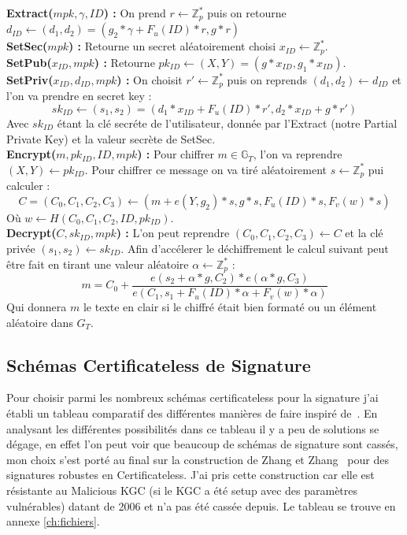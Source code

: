 \textbf{Extract($mpk, \gamma, ID$) :} On prend $r \leftarrow \mathbb{Z}_p^*$ puis on retourne $d_{ID} \leftarrow (d_1, d_2) = (g_2*\gamma + F_u(ID)*r, g*r)$\\
\textbf{SetSec($mpk$) :} Retourne un secret aléatoirement choisi $x_{ID} \leftarrow \mathbb{Z}_p^*$.\\
\textbf{SetPub($x_{ID}, mpk$) :} Retourne $pk_{ID} \leftarrow (X,Y) = (g*x_{ID}, g_1*x_{ID})$.\\
\textbf{SetPriv($x_{ID}, d_{ID}, mpk$) :} On choisit $r' \leftarrow \mathbb{Z}_p^*$ puis on reprends $(d_1, d_2) \leftarrow d_{ID}$ et l'on va prendre en secret key : 
\[sk_{ID} \leftarrow (s_1, s_2) = (d_1*x_{ID} + F_u(ID)*r', d_2*x_{ID} + g*r')\]
Avec $sk_{ID}$ étant la clé secréte de l'utilisateur, donnée par l'Extract (notre Partial Private Key) et la valeur secrète de SetSec.\\
\textbf{Encrypt($m, pk_{ID}, ID, mpk$) :} Pour chiffrer $m \in \mathbb{G}_T$, l'on va reprendre $(X,Y) \leftarrow pk_{ID}$. Pour chiffrer ce message on va tiré aléatoirement $s \leftarrow \mathbb{Z}_p^*$ pui calculer : 
\[C = (C_0, C_1, C_2, C_3) \leftarrow (m + e(Y, g_2)*s, g*s,F_u(ID)*s, F_v(w)*s )\]
Où $w \leftarrow H(C_0,C_1, C_2, ID, pk_{ID})$.\\
\textbf{Decrypt($C, sk_{ID}, mpk$) :} L'on peut reprendre $(C_0,C_1,C_2,C_3) \leftarrow C$ et la clé privée $(s_1, s_2) \leftarrow sk_{ID}$. Afin d'accélerer le déchiffrement le calcul suivant peut être fait en tirant une valeur aléatoire $\alpha \leftarrow \mathbb{Z}_p^*$ :
\[m = C_0 + \frac{e(s_2 + \alpha*g, C_2 )*e(\alpha*g, C_3)}{e(C_1, s_1 + F_u(ID)*\alpha + F_v(w)*\alpha)}\]
Qui donnera $m$ le texte en clair si le chiffré était bien formaté ou un élément aléatoire dans $G_T$.
\subsection{Schémas Certificateless de Signature}
Pour choisir parmi les nombreux schémas certificateless pour la signature j'ai établi un tableau comparatif des différentes manières de faire inspiré de~\cite{bookIntroCertificateless}. En analysant les différentes possibilités dans ce tableau il y a peu de solutions se dégage, en effet l'on peut voir que beaucoup de schémas de signature sont cassés, mon choix s'est porté au final sur la construction de Zhang et Zhang~\cite{DBLP:conf/acns/ZhangWXF06} pour des signatures robustes en Certificateless. J'ai pris cette construction car elle est résistante au Malicious KGC (si le KGC a été setup avec des paramètres vulnérables) datant de 2006 et n'a pas été cassée depuis. Le tableau se trouve en annexe \ref{ch:fichiers}.
